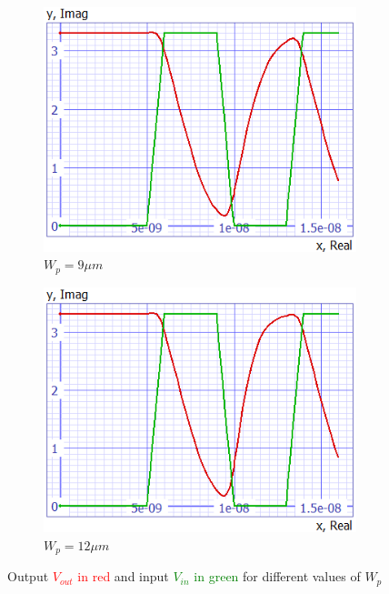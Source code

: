 \documentclass[../main.tex]{subfiles}
\begin{document}
{{\begin{figure}[H]
				\begin{subfigure}{0.3\textwidth}
					\centering
					\includegraphics[width=\textwidth]{plots/Q7_Wp9.png}
					\caption{$W_p = 9\mu m$}
					\label{fig:subfig4}
				\end{subfigure}
				\begin{subfigure}{0.3\textwidth}
					\centering
					\includegraphics[width=\textwidth]{plots/Q7_Wp12.png}
					\caption{$W_p = 12\mu m$}
					\label{fig:subfig5}
				\end{subfigure}
				
				\caption{Output \textcolor{red}{$V_{out}$ in red} and input \textcolor{green}{$V_{in}$ in green} for different values of $W_p$}
				\label{fig:mainfigWn}
			\end{figure}
			
}}
\end{document}
